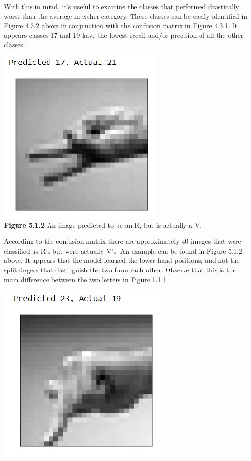 \documentclass[11pt]{article}
\begin{document}
\begin{multicols}{2}
\par
With this in mind, it's useful to examine the classes that performed drastically worst than the average in either category.  These classes can be easily identified in Figure 4.3.2 above in conjunction with the confusion matrix in Figure 4.3.1.  It appears classes 17 and 19 have the lowest recall and/or precision of all the other classes.  

\begin{center}
\includegraphics[scale=.70]{ConfusedIm1} \\
\textbf{Figure 5.1.2} An image predicted to be an R, but is actually a V.
\end{center}
\par
According to the confusion matrix there are approximately 40 images that were classified as R's but were actually V's.  An example can be found in Figure 5.1.2 above.  It appears that the model learned the lower hand positions, and not the split fingers that distinguish the two from each other.  Observe that this is the main difference between the two letters in Figure 1.1.1.
\begin{center}
\includegraphics[scale=.70]{ConfusedIm2} \\

\end{center}
\end{multicols}
\end{document}
